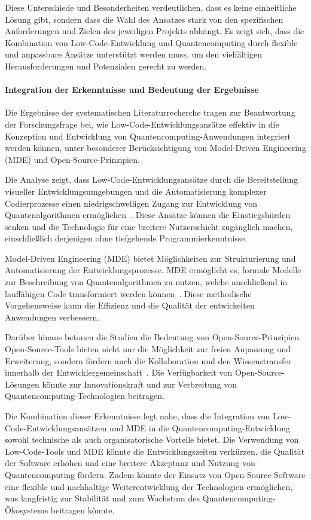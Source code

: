 Diese Unterschiede und Besonderheiten verdeutlichen, dass es keine einheitliche Lösung gibt, sondern dass die Wahl 
des Ansatzes stark von den spezifischen Anforderungen und Zielen des jeweiligen Projekts abhängt. Es zeigt sich, dass 
die Kombination von Low-Code-Entwicklung und Quantencomputing durch flexible und anpassbare Ansätze unterstützt werden 
muss, um den vielfältigen Herausforderungen und Potenzialen gerecht zu werden.

\paragraph{Integration der Erkenntnisse und Bedeutung der Ergebnisse}

Die Ergebnisse der systematischen Literaturrecherche tragen zur Beantwortung der Forschungsfrage bei, 
wie Low-Code-Entwicklungsansätze effektiv in die Konzeption und Entwicklung von Quantencomputing-Anwendungen 
integriert werden können, unter besonderer Berücksichtigung von Model-Driven Engineering (MDE) und Open-Source-Prinzipien.

Die Analyse zeigt, dass Low-Code-Entwicklungsansätze durch die Bereitstellung visueller Entwicklungsumgebungen 
und die Automatisierung komplexer Codierprozesse einen niedrigschwelligen Zugang zur Entwicklung von 
Quantenalgorithmen ermöglichen~\cite{Sahay_2020, Bock_2021}. Diese Ansätze können die Einstiegshürden senken und 
die Technologie für eine breitere Nutzerschicht zugänglich machen, einschließlich derjenigen ohne tiefgehende 
Programmierkenntnisse.

Model-Driven Engineering (MDE) bietet Möglichkeiten zur Strukturierung und Automatisierung der Entwicklungsprozesse. 
MDE ermöglicht es, formale Modelle zur Beschreibung von Quantenalgorithmen zu nutzen, welche anschließend in 
lauffähigen Code transformiert werden können~\cite{Gemeinhardt_2021, Perez-Castillo_2022}. Diese methodische 
Vorgehensweise kann die Effizienz und die Qualität der entwickelten Anwendungen verbessern.

Darüber hinaus betonen die Studien die Bedeutung von Open-Source-Prinzipien. Open-Source-Tools bieten nicht nur 
die Möglichkeit zur freien Anpassung und Erweiterung, sondern fördern auch die Kollaboration und den Wissenstransfer 
innerhalb der Entwicklergemeinschaft~\cite{Amato_2023, Ahmad_2023}. Die Verfügbarkeit von Open-Source-Lösungen 
könnte zur Innovationskraft und zur Verbreitung von Quantencomputing-Technologien beitragen.

Die Kombination dieser Erkenntnisse legt nahe, dass die Integration von Low-Code-Entwicklungsansätzen und MDE in 
die Quantencomputing-Entwicklung sowohl technische als auch organisatorische Vorteile bietet. Die Verwendung von 
Low-Code-Tools und MDE könnte die Entwicklungszeiten verkürzen, die Qualität der Software erhöhen und eine breitere 
Akzeptanz und Nutzung von Quantencomputing fördern. Zudem könnte der Einsatz von Open-Source-Software eine flexible 
und nachhaltige Weiterentwicklung der Technologien ermöglichen, was langfristig zur Stabilität und zum Wachstum des 
Quantencomputing-Ökosystems beitragen könnte.

